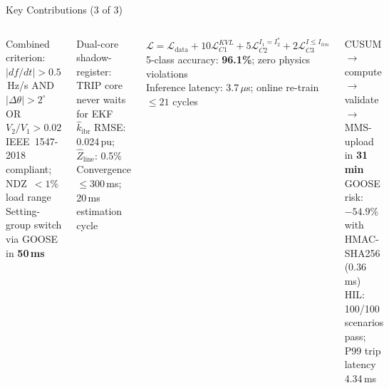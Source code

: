 \documentclass[aspectratio=169, 10pt]{beamer}
\newcommand{\kibr}{k_{\mathrm{ibr}}}
\begin{document}
\begin{frame}{Key Contributions (3 of 3)}
  \begin{columns}[T]
      \vspace{0.2cm}
      \begin{tcolorbox}[keyfact, title=C3 --- Mode-Adaptive Islanding Detection]
        \scriptsize
        Combined criterion: $|df/dt|{>}0.5$\,Hz/s AND $|\Delta\theta|{>}2^\circ$
        OR $V_2/V_1{>}0.02$\\[2pt]
        IEEE~1547-2018 compliant; NDZ~$<1\%$ load range\\
        Setting-group switch via GOOSE in \textbf{50\,ms}
      \end{tcolorbox}
      \vspace{0.2cm}
      \begin{tcolorbox}[keyfact, title=C4 --- Non-Blocking EKF Digital Twin]
        \scriptsize
        Dual-core shadow-register: TRIP core never waits for EKF\\
        $\hat\kibr$ RMSE: 0.024\,pu; $\hat Z_\mathrm{line}$: 0.5\%\\
        Convergence $\leq 300$\,ms; 20\,ms estimation cycle
      \end{tcolorbox}
      \vspace{0.2cm}
      \begin{tcolorbox}[keyfact, title=C5 --- Physics-Informed Neural Network]
        \scriptsize
        $\mathcal{L} = \mathcal{L}_\mathrm{data} + 10\mathcal{L}_{C1}^{KVL}
        + 5\mathcal{L}_{C2}^{I_1=I_2^*} + 2\mathcal{L}_{C3}^{I\leq I_{lim}}$\\[2pt]
        5-class accuracy: \textbf{96.1\%}; zero physics violations\\
        Inference latency: 3.7\,$\mu$s; online re-train $\leq 21$ cycles
      \end{tcolorbox}
      \vspace{0.2cm}
      \begin{tcolorbox}[keyfact, title=C6 --- Closed-Loop WAPC]
        \scriptsize
        CUSUM$\to$compute$\to$validate$\to$MMS-upload in \textbf{31\,min}\\
        GOOSE risk: $-54.9\%$ with HMAC-SHA256 (0.36\,ms)\\
        HIL: 100/100 scenarios pass; P99 trip latency 4.34\,ms
      \end{tcolorbox}


\end{columns}
\end{frame}
\end{document}
